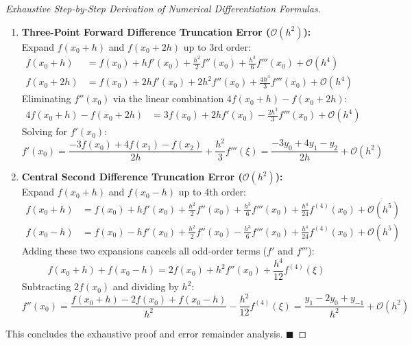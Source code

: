 \begin{proof}[Exhaustive Step-by-Step Derivation of Numerical Differentiation Formulas]
\begin{enumerate}
    \item \textbf{Three-Point Forward Difference Truncation Error ($\mathcal{O}(h^2)$):} \\
    Expand $f(x_0 + h)$ and $f(x_0 + 2h)$ up to 3rd order:
    \begin{align}
        f(x_0 + h) &= f(x_0) + h f'(x_0) + \frac{h^2}{2} f''(x_0) + \frac{h^3}{6} f'''(x_0) + \mathcal{O}(h^4) \\
        f(x_0 + 2h) &= f(x_0) + 2h f'(x_0) + 2h^2 f''(x_0) + \frac{4h^3}{3} f'''(x_0) + \mathcal{O}(h^4)
    \end{align}
    Eliminating $f''(x_0)$ via the linear combination $4 f(x_0 + h) - f(x_0 + 2h)$:
    \begin{align}
        4 f(x_0 + h) - f(x_0 + 2h) &= 3 f(x_0) + 2h f'(x_0) - \frac{2h^3}{3} f'''(x_0) + \mathcal{O}(h^4)
    \end{align}
    Solving for $f'(x_0)$:
    \begin{equation}
        \boxed{f'(x_0) = \frac{-3 f(x_0) + 4 f(x_1) - f(x_2)}{2h} + \frac{h^2}{3} f'''(\xi)} = \frac{-3y_0 + 4y_1 - y_2}{2h} + \mathcal{O}(h^2)
    \end{equation}
    
    \item \textbf{Central Second Difference Truncation Error ($\mathcal{O}(h^2)$):} \\
    Expand $f(x_0 + h)$ and $f(x_0 - h)$ up to 4th order:
    \begin{align}
        f(x_0 + h) &= f(x_0) + h f'(x_0) + \frac{h^2}{2} f''(x_0) + \frac{h^3}{6} f'''(x_0) + \frac{h^4}{24} f^{(4)}(x_0) + \mathcal{O}(h^5) \\
        f(x_0 - h) &= f(x_0) - h f'(x_0) + \frac{h^2}{2} f''(x_0) - \frac{h^3}{6} f'''(x_0) + \frac{h^4}{24} f^{(4)}(x_0) + \mathcal{O}(h^5)
    \end{align}
    Adding these two expansions cancels all odd-order terms ($f'$ and $f'''$):
    \begin{equation}
        f(x_0 + h) + f(x_0 - h) = 2 f(x_0) + h^2 f''(x_0) + \frac{h^4}{12} f^{(4)}(\xi)
    \end{equation}
    Subtracting $2 f(x_0)$ and dividing by $h^2$:
    \begin{equation}
        \boxed{f''(x_0) = \frac{f(x_0 + h) - 2 f(x_0) + f(x_0 - h)}{h^2} - \frac{h^2}{12} f^{(4)}(\xi)} = \frac{y_1 - 2y_0 + y_{-1}}{h^2} + \mathcal{O}(h^2)
    \end{equation}
\end{enumerate}
This concludes the exhaustive proof and error remainder analysis. $\blacksquare$
\end{proof}

